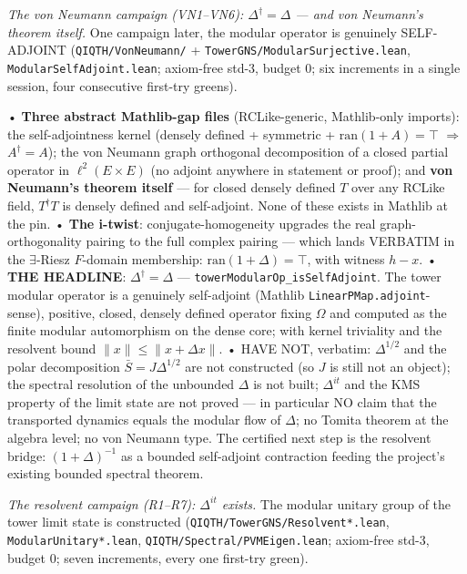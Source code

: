\documentclass[11pt,a4paper]{article}
\begin{document}
\emph{The von Neumann campaign (VN1--VN6): $\Delta^\dagger = \Delta$ — and von Neumann's theorem itself.} One campaign later, the modular operator is genuinely SELF-ADJOINT (\texttt{QIQTH/VonNeumann/} + \texttt{TowerGNS/ModularSurjective.lean}, \texttt{ModularSelfAdjoint.lean}; axiom-free std-3, budget 0; six increments in a single session, four consecutive first-try greens).

  • \textbf{Three abstract Mathlib-gap files} (RCLike-generic, Mathlib-only imports): the self-adjointness kernel (densely defined + symmetric + $\mathrm{ran}(1+A) = \top$ $\Rightarrow$ $A^\dagger = A$); the von Neumann graph orthogonal decomposition of a closed partial operator in $\ell^2(E \times E)$ (no adjoint anywhere in statement or proof); and \textbf{von Neumann's theorem itself} — for closed densely defined $T$ over any RCLike field, $T^\dagger T$ is densely defined and self-adjoint. None of these exists in Mathlib at the pin.
  • \textbf{The i-twist}: conjugate-homogeneity upgrades the real graph-orthogonality pairing to the full complex pairing — which lands VERBATIM in the $\exists$-Riesz $F$-domain membership: $\mathrm{ran}(1+\Delta) = \top$, with witness $h - x$.
  • \textbf{THE HEADLINE}: $\Delta^\dagger = \Delta$ — \texttt{towerModularOp\_isSelfAdjoint}. The tower modular operator is a genuinely self-adjoint (Mathlib \texttt{LinearPMap.adjoint}-sense), positive, closed, densely defined operator fixing $\Omega$ and computed as the finite modular automorphism on the dense core; with kernel triviality and the resolvent bound $\|x\| \le \|x + \Delta x\|$.
  • HAVE NOT, verbatim: $\Delta^{1/2}$ and the polar decomposition $\bar S = J\Delta^{1/2}$ are not constructed (so $J$ is still not an object); the spectral resolution of the unbounded $\Delta$ is not built; $\Delta^{it}$ and the KMS property of the limit state are not proved — in particular NO claim that the transported dynamics equals the modular flow of $\Delta$; no Tomita theorem at the algebra level; no von Neumann type. The certified next step is the resolvent bridge: $(1+\Delta)^{-1}$ as a bounded self-adjoint contraction feeding the project's existing bounded spectral theorem.

\emph{The resolvent campaign (R1--R7): $\Delta^{it}$ exists.} The modular unitary group of the tower limit state is constructed (\texttt{QIQTH/TowerGNS/Resolvent*.lean}, \texttt{ModularUnitary*.lean}, \texttt{QIQTH/Spectral/PVMEigen.lean}; axiom-free std-3, budget 0; seven increments, every one first-try green).
\end{document}
